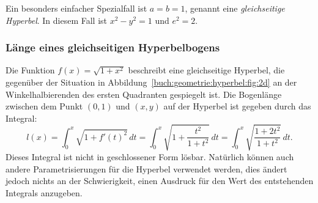 Ein besonders einfacher Spezialfall ist $a=b=1$, genannt eine
{\em gleichseitige Hyperbel}.
%
%
In diesem Fall ist $x^2-y^2=1$ und $e^2=2$.

%
%
\subsubsection{Länge eines gleichseitigen Hyperbelbogens}
Die Funktion $f(x)=\sqrt{1+x^2}$ beschreibt eine gleichseitige
Hyperbel, die gegenüber der Situation in
Abbildung~\ref{buch:geometrie:hyperbel:fig:2d}
an der Winkelhalbierenden des ersten Quadranten gespiegelt ist.
Die Bogenlänge zwischen dem Punkt $(0,1)$ und $(x,y)$ auf der
Hyperbel ist gegeben durch das Integral:
\[
l(x)
=
\int_0^x \sqrt{1+f'(t)^2}\,dt
=
\int_0^x \sqrt{1+\frac{t^2}{1+t^2}}\,dt
=
\int_0^x \sqrt{\frac{1+2t^2}{1+t^2}}\,dt.
\]
Dieses Integral ist nicht in geschlossener Form lösbar.
Natürlich können auch andere Parametrisierungen für die Hyperbel
verwendet werden, dies ändert jedoch
nichts an der Schwierigkeit, einen Ausdruck für den Wert des
entstehenden Integrals anzugeben.

%
%
